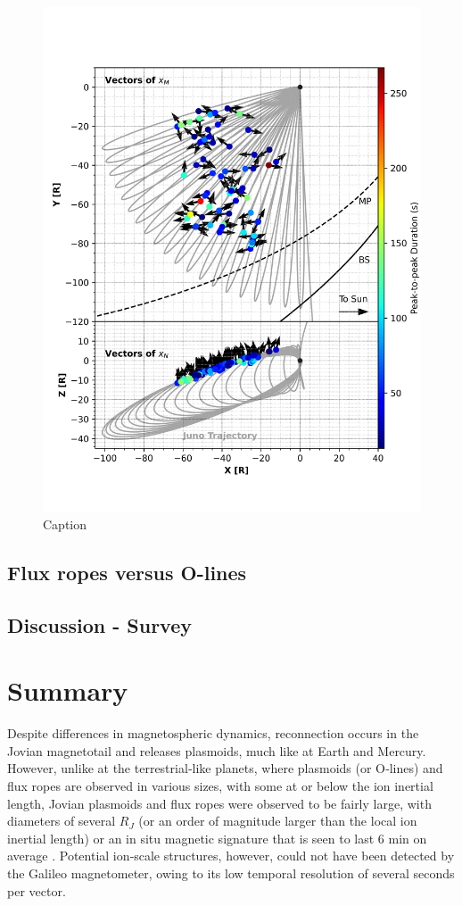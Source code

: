 \begin{figure}
    \centering
    \includegraphics{images5/TrajectoryLocationofEvent_quiver_selected.png}
    \caption{Caption}
    \label{fig:trajectory-quiver}
\end{figure}

\subsection{Flux ropes versus O-lines}

\subsection{Discussion - Survey}

\section{Summary}

Despite differences in magnetospheric dynamics, reconnection occurs in the Jovian magnetotail and releases plasmoids, much like at Earth and Mercury. However, unlike at the terrestrial‐like planets, where plasmoids (or O‐lines) and flux ropes are observed in various sizes, with some at or below the ion inertial length, Jovian plasmoids and flux ropes were observed to be fairly large, with diameters of several $R_J$ (or an order of magnitude larger than the local ion inertial length) or an in situ magnetic signature that is seen to last 6 min on average \cite{Vogt2014}. Potential ion‐scale structures, however, could not have been detected by the Galileo magnetometer, owing to its low temporal resolution of several seconds per vector.

